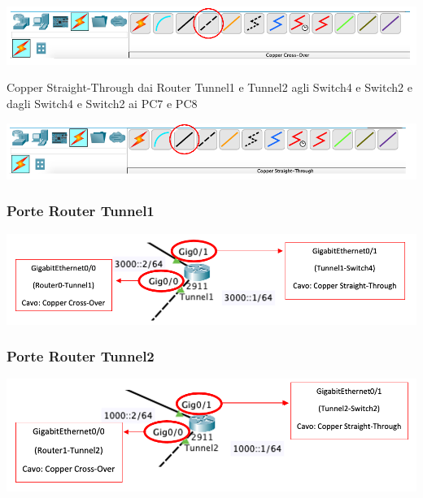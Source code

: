 \begin{center}
    \includegraphics[width=\linewidth]{images/07.routing-sicurezza/tunneling/04.png}
\end{center}

\noindent Copper Straight-Through dai Router Tunnel1 e Tunnel2 agli Switch4 e Switch2 e dagli Switch4 e Switch2 ai PC7 e PC8

\begin{center}
    \includegraphics[width=\linewidth]{images/07.routing-sicurezza/tunneling/05.png}
\end{center}

\subsubsection*{Porte Router Tunnel1}

\begin{center}
    \includegraphics[width=\linewidth]{images/07.routing-sicurezza/tunneling/06.png}
\end{center}

\subsubsection*{Porte Router Tunnel2}

\begin{center}
    \includegraphics[width=\linewidth]{images/07.routing-sicurezza/tunneling/07.png}
\end{center}

